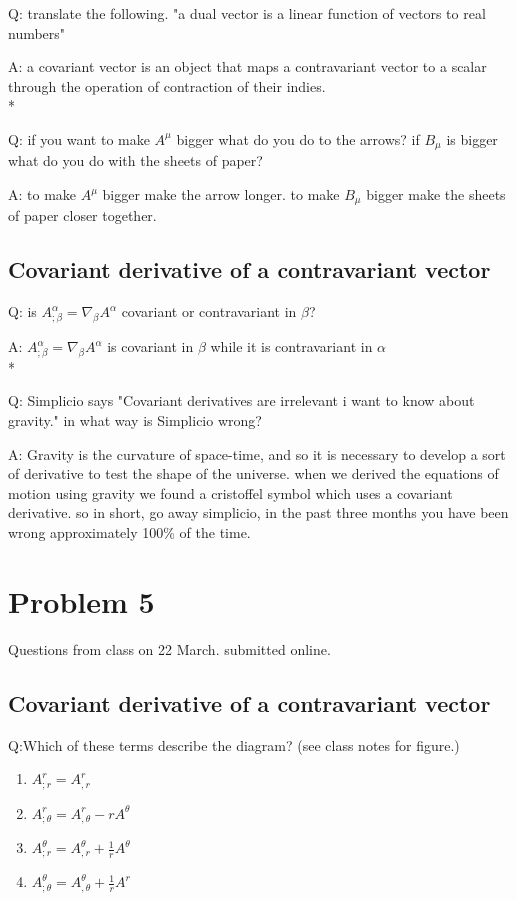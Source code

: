 \documentclass{article}
\begin{document}
\hspace{0.5cm}Q: translate the following. "a dual vector is a linear function of vectors to real numbers"

A: a covariant vector is an object that maps a contravariant vector to a scalar through the operation of contraction of their indies. 
\\*

Q: if you want to make $A^{\mu}$ bigger what do you do to the arrows? if $B_{\mu}$ is bigger what do you do with the sheets of paper?

A: to make $A^{\mu}$ bigger make the arrow longer. to make $B_{\mu}$ bigger make the sheets of paper closer together.

\subsection{Covariant derivative of a contravariant vector}

\hspace{0.5cm}Q: is $A^{\alpha}_{;\beta}=\nabla_{\beta}A^{\alpha}$ covariant or contravariant in $\beta$?

A: $A^{\alpha}_{;\beta}=\nabla_{\beta}A^{\alpha}$ is covariant in $\beta$ while it is contravariant in $\alpha$
\\*

Q: Simplicio says "Covariant derivatives are irrelevant i want to know about gravity." in what way is Simplicio wrong?

A: Gravity is the curvature of space-time, and so it is necessary to develop a sort of derivative to test the shape of the universe. when we derived the equations of motion using gravity we found a cristoffel symbol which uses a covariant derivative. so in short, go away simplicio, in the past three months you have been wrong approximately 100\% of the time. 

\newpage


\section{Problem 5}
Questions from class on 22 March. submitted online.
\subsection{Covariant derivative of a contravariant vector}
\hspace{0.5cm}Q:Which of these terms describe the diagram? (see class notes for figure.)
\begin{enumerate}
\item $A^{r}_{;r}=A^{r}_{,r}$
\item $A^{r}_{;\theta}=A^{r}_{,\theta}-rA^{\theta}$
\item $A^{\theta}_{;r}=A^{\theta}_{,r}+\frac{1}{r}A^{\theta}$
\item $A^{\theta}_{;\theta}=A^{\theta}_{,\theta}+\frac{1}{r}A^{r}$
\end{enumerate}
\end{document}
